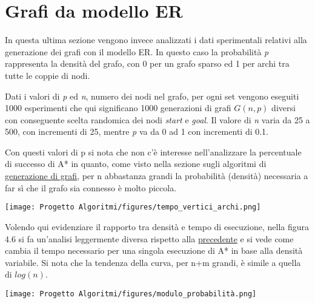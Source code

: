 \documentclass[12pt,a4paper]{report}
\begin{document}

\section{Grafi da modello ER}\label{se:grafi-modello-ER}
In questa ultima sezione vengono invece analizzati i dati sperimentali relativi alla generazione dei grafi con il modello ER.
In questo caso la probabilità \textit{p} rappresenta la densità del grafo, con 0 per un grafo sparso ed 1 per archi tra tutte le coppie di nodi.

Dati i valori di \textit{p} ed \textit{n}, numero dei nodi nel grafo, per ogni set vengono eseguiti 1000 esperimenti che qui significano 1000 generazioni di grafi $G(n,p)$ diversi con conseguente scelta randomica dei nodi \textit{start} e \textit{goal}.
Il valore di \textit{n} varia da 25 a 500, con incrementi di 25, mentre \textit{p} va da 0 ad 1 con incrementi di 0.1.

Con questi valori di p si nota che non c'è interesse nell'analizzare la percentuale di successo di A* in quanto, come visto nella sezione sugli algoritmi di \hyperref[se:algo-gen-anal]{generazione di grafi}, per n abbastanza grandi la probabilità (densità) necessaria a far sì che il grafo sia connesso è molto piccola.

\texttt{[image: Progetto Algoritmi/figures/tempo\_vertici\_archi.png]}

\medskip
\medskip

Volendo qui evidenziare il rapporto tra densità e tempo di esecuzione, nella figura 4.6 si fa un'analisi leggermente diversa rispetto alla \hyperref[img:tempo-nodi-astar]{precedente} e si vede come cambia il tempo necessario per una singola esecuzione di A* in base alla densità variabile. 
Si nota che la tendenza della curva, per n+m grandi, è simile a quella di $log(n)$.

\texttt{[image: Progetto Algoritmi/figures/modulo\_probabilità.png]}

\medskip
\medskip
\end{document}
